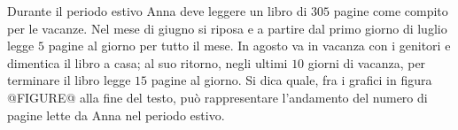Durante il periodo estivo Anna deve leggere un libro di \(305\) pagine come compito per le vacanze. Nel mese di giugno
si riposa e a partire dal primo giorno di luglio legge \(5\) pagine al giorno per tutto il mese. In agosto va in
vacanza con i genitori e dimentica il libro a casa; al suo ritorno, negli ultimi \(10\) giorni di vacanza, per
terminare il libro legge \(15\) pagine al giorno.
Si dica quale, fra i grafici
in figura 
@FIGURE@ alla fine del testo, 
può rappresentare l’andamento del numero di pagine lette da Anna nel periodo estivo.